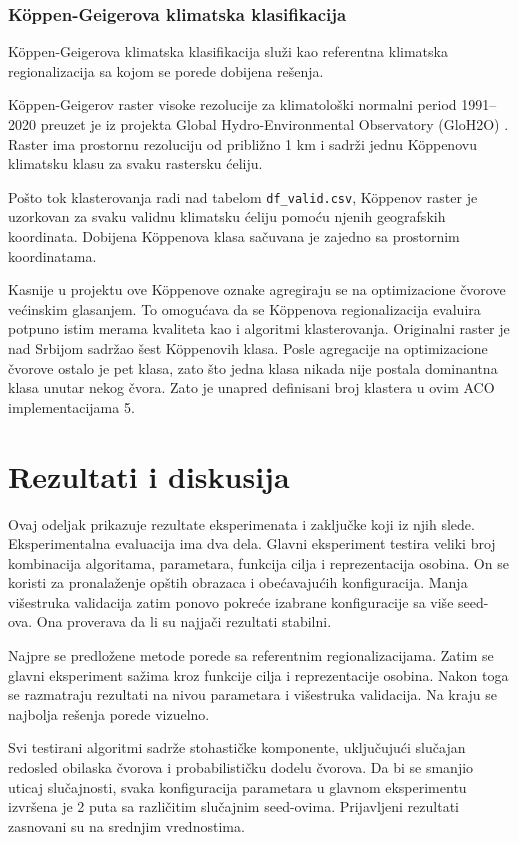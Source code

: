 \documentclass[11pt]{article}
\begin{document}
\subsubsection{Köppen-Geigerova klimatska klasifikacija}

Köppen-Geigerova klimatska klasifikacija služi kao referentna klimatska regionalizacija sa kojom se porede dobijena rešenja.

Köppen-Geigerov raster visoke rezolucije za klimatološki normalni period 1991--2020 preuzet je iz projekta Global Hydro-Environmental Observatory (GloH2O) \cite{beck2018}. Raster ima prostornu rezoluciju od približno 1 km i sadrži jednu Köppenovu klimatsku klasu za svaku rastersku ćeliju.

Pošto tok klasterovanja radi nad tabelom \texttt{df\_valid.csv}, Köppenov raster je uzorkovan za svaku validnu klimatsku ćeliju pomoću njenih geografskih koordinata. Dobijena Köppenova klasa sačuvana je zajedno sa prostornim koordinatama.

Kasnije u projektu ove Köppenove oznake agregiraju se na optimizacione čvorove većinskim glasanjem. To omogućava da se Köppenova regionalizacija evaluira potpuno istim merama kvaliteta kao i algoritmi klasterovanja. Originalni raster je nad Srbijom sadržao šest Köppenovih klasa. Posle agregacije na optimizacione čvorove ostalo je pet klasa, zato što jedna klasa nikada nije postala dominantna klasa unutar nekog čvora. Zato je unapred definisani broj klastera u ovim ACO implementacijama 5.

\section{Rezultati i diskusija}
\label{sec:results}
Ovaj odeljak prikazuje rezultate eksperimenata i zaključke koji iz njih slede. Eksperimentalna evaluacija ima dva dela. Glavni eksperiment testira veliki broj kombinacija algoritama, parametara, funkcija cilja i reprezentacija osobina. On se koristi za pronalaženje opštih obrazaca i obećavajućih konfiguracija. Manja višestruka validacija zatim ponovo pokreće izabrane konfiguracije sa više seed-ova. Ona proverava da li su najjači rezultati stabilni.

Najpre se predložene metode porede sa referentnim regionalizacijama. Zatim se glavni eksperiment sažima kroz funkcije cilja i reprezentacije osobina. Nakon toga se razmatraju rezultati na nivou parametara i višestruka validacija. Na kraju se najbolja rešenja porede vizuelno.

Svi testirani algoritmi sadrže stohastičke komponente, uključujući slučajan redosled obilaska čvorova i probabilističku dodelu čvorova. Da bi se smanjio uticaj slučajnosti, svaka konfiguracija parametara u glavnom eksperimentu izvršena je 2 puta sa različitim slučajnim seed-ovima. Prijavljeni rezultati zasnovani su na srednjim vrednostima.
\end{document}
